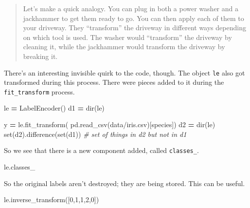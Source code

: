 \documentclass[
  letterpaper,
]{scrbook}
\newenvironment{Shaded}{\begin{snugshade}}{\end{snugshade}}
\newcommand{\BuiltInTok}[1]{#1}
\newcommand{\CommentTok}[1]{\textcolor[rgb]{0.56,0.35,0.01}{\textit{#1}}}
\newcommand{\DecValTok}[1]{\textcolor[rgb]{0.00,0.00,0.81}{#1}}
\newcommand{\NormalTok}[1]{#1}
\newcommand{\OperatorTok}[1]{\textcolor[rgb]{0.81,0.36,0.00}{\textbf{#1}}}
\newcommand{\StringTok}[1]{\textcolor[rgb]{0.31,0.60,0.02}{#1}}
\begin{document}
\begin{quote}
Let's make a quick analogy. You can plug in both a power washer and a
jackhammer to get them ready to go. You can then apply each of them to your
driveway. They ``transform'' the driveway in different ways depending on which
tool is used. The washer would ``transform'' the driveway by cleaning it, while
the jackhammer would transform the driveway by breaking it.
\end{quote}

There's an interesting invisible quirk to the code, though. The object \texttt{le} also got transformed during this
process. There were pieces added to it during the \texttt{fit\_transform} process.

\begin{Shaded}
\begin{Highlighting}[]
\NormalTok{le }\OperatorTok{=}\NormalTok{ LabelEncoder()}
\NormalTok{d1 }\OperatorTok{=} \BuiltInTok{dir}\NormalTok{(le)}
\end{Highlighting}
\end{Shaded}

\begin{Shaded}
\begin{Highlighting}[]
\NormalTok{y }\OperatorTok{=}\NormalTok{ le.fit\_transform( pd.read\_csv(}\StringTok{\textquotesingle{}data/iris.csv\textquotesingle{}}\NormalTok{)[}\StringTok{\textquotesingle{}species\textquotesingle{}}\NormalTok{])}
\NormalTok{d2 }\OperatorTok{=} \BuiltInTok{dir}\NormalTok{(le)}
\BuiltInTok{set}\NormalTok{(d2).difference(}\BuiltInTok{set}\NormalTok{(d1)) }\CommentTok{\# set of things in d2 but not in d1}
\end{Highlighting}
\end{Shaded}

So we see that there is a new component added, called \texttt{classes\_}.

\begin{Shaded}
\begin{Highlighting}[]
\NormalTok{le.classes\_}
\end{Highlighting}
\end{Shaded}

So the original labels aren't destroyed; they are being stored. This can be useful.

\begin{Shaded}
\begin{Highlighting}[]
\NormalTok{le.inverse\_transform([}\DecValTok{0}\NormalTok{,}\DecValTok{1}\NormalTok{,}\DecValTok{1}\NormalTok{,}\DecValTok{2}\NormalTok{,}\DecValTok{0}\NormalTok{])}
\end{Highlighting}
\end{Shaded}
\end{document}
